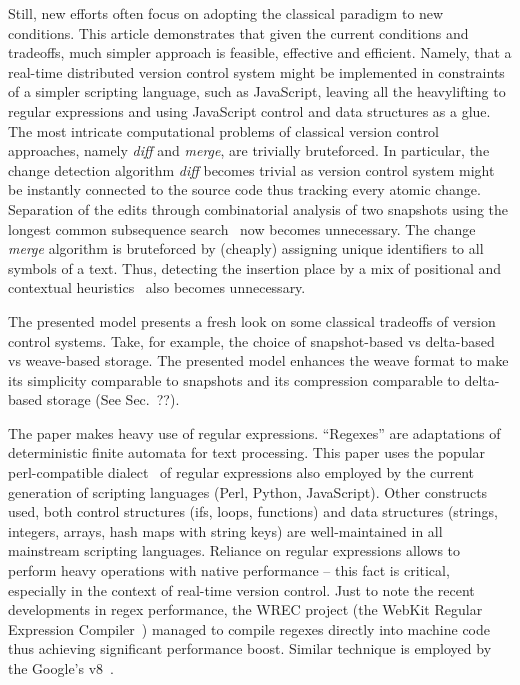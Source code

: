 \documentclass{acm_proc_article-sp}
\begin{document}
Still, new efforts often focus on adopting the classical paradigm to new conditions. This article demonstrates that given the current conditions and tradeoffs, much simpler approach is feasible, effective and efficient.
Namely, that a real-time distributed version control system might be implemented in constraints of a simpler scripting language, such as JavaScript, leaving all the heavylifting to regular expressions and using JavaScript control and data structures as a glue.
The most intricate computational problems of classical version control  approaches, namely \emph{diff} and \emph{merge}, are trivially bruteforced. In particular, the change detection algorithm \emph{diff} becomes trivial as version control system might be instantly connected to the source code thus tracking every atomic change. Separation of the edits through combinatorial analysis of two snapshots using the longest common subsequence search~\cite{diff} now becomes unnecessary. The change \emph{merge} algorithm is bruteforced by (cheaply) assigning unique identifiers to all symbols of a text. Thus, detecting the insertion place by a mix of positional and contextual heuristics~\cite{fraser} also becomes unnecessary.

The presented model presents a fresh look on some classical tradeoffs of version control systems. Take, for example, the choice of snapshot-based vs delta-based vs weave-based storage. The presented model enhances the weave format to make its simplicity comparable to snapshots and its compression comparable to delta-based storage (See Sec.~??).


The paper makes heavy use of regular expressions. ``Regexes'' are adaptations of deterministic finite automata for text processing. This paper uses the popular perl-compatible dialect~\cite{pcre} of regular expressions also employed by the current generation of scripting languages (Perl, Python, JavaScript). Other constructs used, both control structures (ifs, loops, functions) and data structures (strings, integers, arrays, hash maps with string keys) are well-maintained in all mainstream scripting languages. Reliance on regular expressions allows to perform heavy operations with native performance -- this fact is critical, especially in the context of real-time version control.
Just to note the recent developments in regex performance, the WREC project (the WebKit Regular Expression Compiler~\cite{wrec}) managed to compile regexes directly into machine code thus achieving significant performance boost. Similar technique is employed by the Google's v8~\cite{v8-change-log}.
\end{document}

